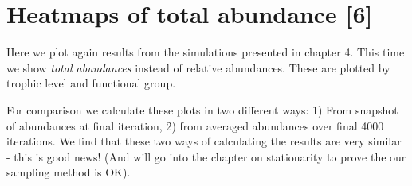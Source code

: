 %
%
%
%
%
%


\section{Heatmaps of total abundance [6]}
\label{sec:tot_tl_abun}

Here we plot again results from the simulations presented in chapter 4. This time we show \emph{total abundances} instead of relative abundances. These are plotted by trophic level and functional group.

For comparison we calculate these plots in two different ways: 1) From snapshot of abundances at final iteration, 2) from averaged abundances over final 4000 iterations. We find that these two ways of calculating the results are very similar - this is good news! (And will go into the chapter on stationarity to prove the our sampling method is OK).

